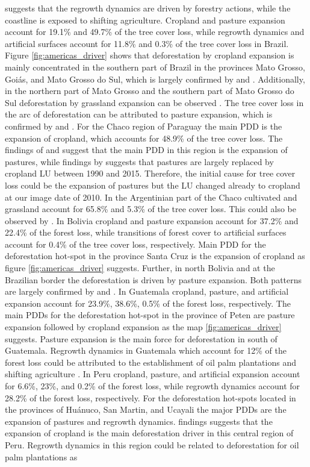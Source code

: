 \citeauthor{Curtis2018} suggests that the regrowth dynamics are driven by forestry actions, while the coastline is exposed to shifting agriculture. Cropland and pasture expansion account for 19.1\% and 49.7\% of the tree cover loss, while regrowth dynamics and artificial surfaces account for 11.8\% and 0.3\% of the tree cover loss in Brazil. Figure \ref{fig:americas_driver} shows that deforestation by cropland expansion is mainly concentrated in the southern part of Brazil in the provinces Mato Grosso, Goi\'{a}s, and Mato Grosso do Sul, which is largely confirmed by \citet{Zalles2018} and \citet{Graesser2015}. Additionally, in the northern part of Mato Grosso and the southern part of Mato Grosso do Sul deforestation by grassland expansion can be observed \citep{Graesser2015,Sy2015}. The tree cover loss in the arc of deforestation can be attributed to pasture expansion, which is confirmed by \citet{Sy2015} and \citet{Graesser2015}. For the Chaco region of Paraguay the main \ac{PDD} is the expansion of cropland, which accounts for 48.9\% of the tree cover loss. The findings of \citet{Graesser2015} and \citet{Caldas2013} suggest that the main \ac{PDD} in this region is the expansion of pastures, while findings by \citet{Graesser2018} suggests that pastures are largely replaced by cropland \ac{LU} between 1990 and 2015. Therefore, the initial cause for tree cover loss could be the expansion of pastures but the \ac{LU} changed already to cropland at our image date of 2010. In the Argentinian part of the Chaco cultivated and grassland account for 65.8\% and 5.3\% of the tree cover loss. This could also be observed by \citet{Sy2015}. In Bolivia cropland and pasture expansion account for 37.2\% and 22.4\% of the forest loss, while transitions of forest cover to artificial surfaces account for 0.4\% of the tree cover loss, respectively. Main \ac{PDD} for the deforestation hot-spot in the province Santa Cruz is the expansion of cropland as figure \ref{fig:americas_driver} suggests. Further, in north Bolivia and at the Brazilian border the deforestation is driven by pasture expansion. Both patterns are largely confirmed by \citet{Graesser2015} and \citet{Sy2015}. In Guatemala cropland, pasture, and artificial expansion account for 23.9\%, 38.6\%, 0.5\% of the forest loss, respectively. The main \acp{PDD} for the deforestation hot-spot in the province of Peten are pasture expansion followed by cropland expansion as the map \ref{fig:americas_driver} suggests. Pasture expansion is the main force for deforestation in south of Guatemala. Regrowth dynamics in Guatemala which account for 12\% of the forest loss could be attributed to the establishment of oil palm plantations and shifting agriculture \citep{Furumo2017,Curtis2018}. In Peru cropland, pasture, and artificial expansion account for 6.6\%, 23\%, and 0.2\% of the forest loss, while regrowth dynamics account for 28.2\% of the forest loss, respectively. For the deforestation hot-spots located in the provinces of Huánuco, San Martin, and Ucayali the major \acp{PDD} are the expansion of pastures and regrowth dynamics. \citep{Sy2015} findings suggests that the expansion of cropland is the main deforestation driver in this central region of Peru. Regrowth dynamics in this region could be related to deforestation for oil palm plantations as 